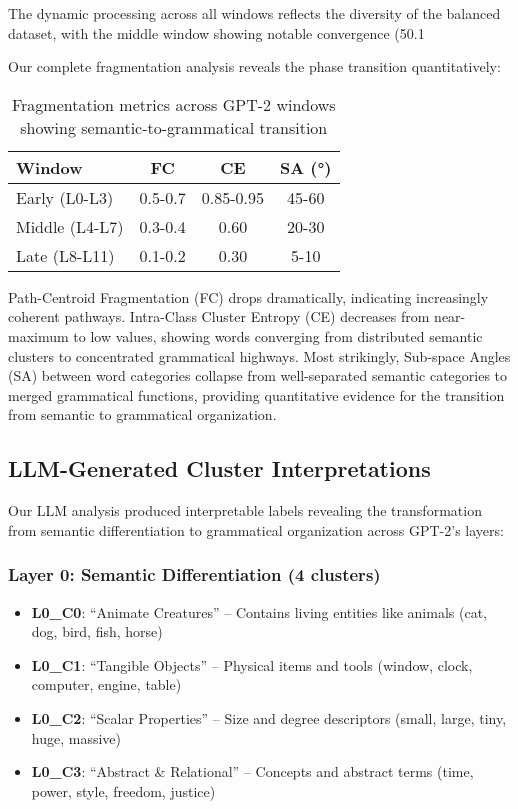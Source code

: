 The dynamic processing across all windows reflects the diversity of the balanced dataset, with the middle window showing notable convergence (50.1%

Our complete fragmentation analysis reveals the phase transition quantitatively:

\begin{table}[h!]
\centering
\caption{Fragmentation metrics across GPT-2 windows showing semantic-to-grammatical transition}
\label{tab:gpt2_fragmentation}
\begin{tabular}{lccc}
\toprule
Window & FC & CE & SA (°) \\
\midrule
Early (L0-L3) & 0.5-0.7 & 0.85-0.95 & 45-60 \\
Middle (L4-L7) & 0.3-0.4 & 0.60 & 20-30 \\
Late (L8-L11) & 0.1-0.2 & 0.30 & 5-10 \\
\bottomrule
\end{tabular}
\end{table}

Path-Centroid Fragmentation (FC) drops dramatically, indicating increasingly coherent pathways. Intra-Class Cluster Entropy (CE) decreases from near-maximum to low values, showing words converging from distributed semantic clusters to concentrated grammatical highways. Most strikingly, Sub-space Angles (SA) between word categories collapse from well-separated semantic categories to merged grammatical functions, providing quantitative evidence for the transition from semantic to grammatical organization.

\subsection{LLM-Generated Cluster Interpretations}

Our LLM analysis produced interpretable labels revealing the transformation from semantic differentiation to grammatical organization across GPT-2's layers:

\subsubsection{Layer 0: Semantic Differentiation (4 clusters)}
\begin{itemize}
    \item \textbf{L0\_C0}: ``Animate Creatures'' -- Contains living entities like animals (cat, dog, bird, fish, horse)
    \item \textbf{L0\_C1}: ``Tangible Objects'' -- Physical items and tools (window, clock, computer, engine, table)
    \item \textbf{L0\_C2}: ``Scalar Properties'' -- Size and degree descriptors (small, large, tiny, huge, massive)
    \item \textbf{L0\_C3}: ``Abstract \& Relational'' -- Concepts and abstract terms (time, power, style, freedom, justice)
\end{itemize}

